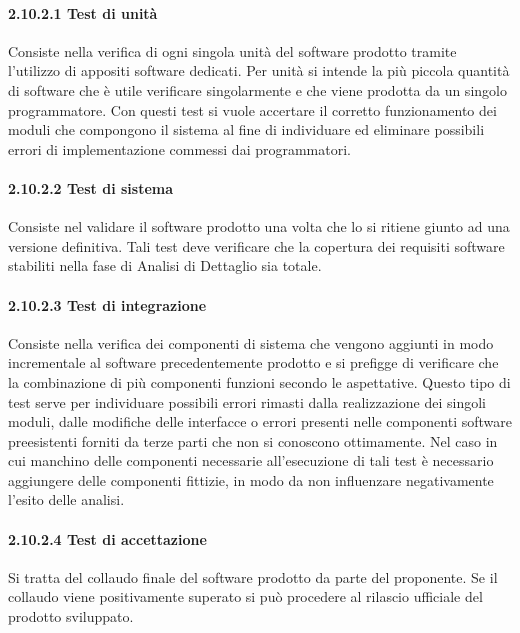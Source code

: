 \paragraph{2.10.2.1 Test di unità}
Consiste nella verifica di ogni singola unità del software prodotto tramite l'utilizzo di appositi software dedicati. Per unità si intende la più piccola quantità di software che è utile verificare singolarmente e che viene prodotta da un singolo programmatore. Con questi test si vuole accertare il corretto funzionamento dei moduli che compongono il sistema al fine di individuare ed eliminare possibili errori di implementazione commessi dai programmatori.

\paragraph{2.10.2.2 Test di sistema}
Consiste nel validare il software prodotto una volta che lo si ritiene giunto ad una versione definitiva. Tali test deve verificare che la copertura dei requisiti software stabiliti nella fase di Analisi di Dettaglio sia totale.

\paragraph{2.10.2.3 Test di integrazione}
Consiste nella verifica dei componenti di sistema che vengono aggiunti in modo incrementale al software precedentemente prodotto e si prefigge di verificare che la combinazione di più componenti funzioni secondo le aspettative. Questo tipo di test serve per individuare possibili errori rimasti dalla realizzazione dei singoli moduli, dalle modifiche delle interfacce o errori presenti nelle componenti software preesistenti forniti da terze parti che non si conoscono ottimamente. Nel caso in cui manchino delle componenti necessarie all'esecuzione di tali test è necessario aggiungere delle componenti fittizie, in modo da non influenzare negativamente l'esito delle analisi.

\paragraph{2.10.2.4 Test di accettazione}
Si tratta del collaudo finale del software prodotto da parte del proponente. Se il collaudo viene positivamente superato si può procedere al rilascio ufficiale del prodotto sviluppato.
